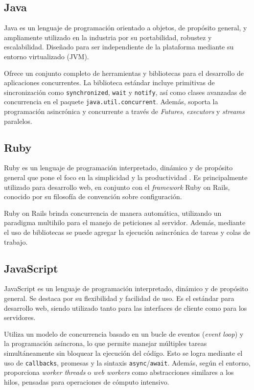 \documentclass[11pt]{article}
\let\Oldsubsection\subsection
\renewcommand{\subsection}{\FloatBarrier\Oldsubsection}
\newcommand{\english}[1]{\textit{#1}}
\begin{document}
\subsection{Java}

Java es un lenguaje de programación orientado a objetos, de propósito general, y ampliamente utilizado en la industria por su portabilidad, robustez y escalabilidad. Diseñado para ser independiente de la plataforma mediante su entorno virtualizado (JVM).

Ofrece un conjunto completo de herramientas y bibliotecas para el desarrollo de aplicaciones concurrentes. La biblioteca estándar incluye primitivas de sincronización como \lstinline{synchronized}, \lstinline{wait} y \lstinline{notify}, así como clases avanzadas de concurrencia en el paquete \lstinline{java.util.concurrent}. Además, soporta la programación asincrónica y concurrente a través de \english{Futures}, \english{executors} y \english{streams} paralelos.

\subsection{Ruby}

Ruby es un lenguaje de programación interpretado, dinámico y de propósito general que pone el foco en la simplicidad y la productividad \cite{com:ruby}. Es principalmente utilizado para desarrollo web, en conjunto con el \english{framework} Ruby on Rails, conocido por su filosofía de convención sobre configuración.

Ruby on Rails brinda concurrencia de manera automática, utilizando un paradigma multihilo para el manejo de peticiones al servidor. Además, mediante el uso de bibliotecas se puede agregar la ejecución asincrónica de tareas y colas de trabajo.

\subsection{JavaScript}

JavaScript es un lenguaje de programación interpretado, dinámico y de propósito general. Se destaca por su flexibilidad y facilidad de uso. Es el estándar para desarrollo web, siendo utilizado tanto para las interfaces de cliente como para los servidores.

Utiliza un modelo de concurrencia basado en un bucle de eventos (\english{event loop}) y la programación asíncrona, lo que permite manejar múltiples tareas simultáneamente sin bloquear la ejecución del código. Esto se logra mediante el uso de \lstinline{callbacks}, promesas y la sintaxis \lstinline{async}/\lstinline{await}. Además, según el entorno, proporciona \english{worker threads} o \english{web workers} como abstracciones similares a los hilos, pensadas para operaciones de cómputo intensivo.
\end{document}
